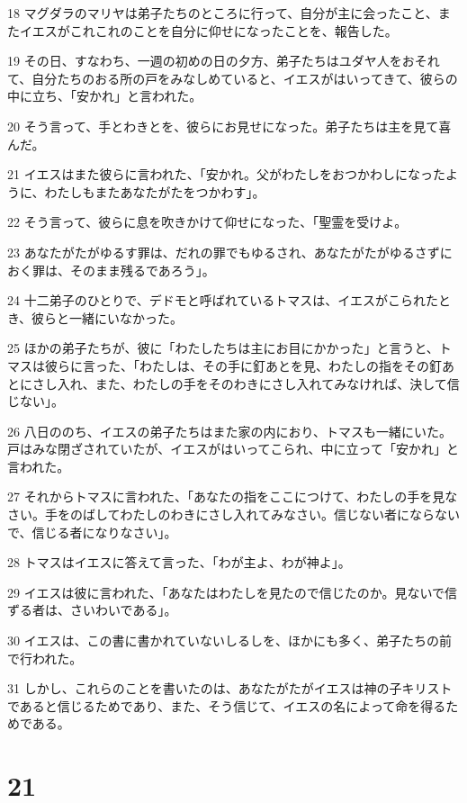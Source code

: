 \par 18 マグダラのマリヤは弟子たちのところに行って、自分が主に会ったこと、またイエスがこれこれのことを自分に仰せになったことを、報告した。
\par 19 その日、すなわち、一週の初めの日の夕方、弟子たちはユダヤ人をおそれて、自分たちのおる所の戸をみなしめていると、イエスがはいってきて、彼らの中に立ち、「安かれ」と言われた。
\par 20 そう言って、手とわきとを、彼らにお見せになった。弟子たちは主を見て喜んだ。
\par 21 イエスはまた彼らに言われた、「安かれ。父がわたしをおつかわしになったように、わたしもまたあなたがたをつかわす」。
\par 22 そう言って、彼らに息を吹きかけて仰せになった、「聖霊を受けよ。
\par 23 あなたがたがゆるす罪は、だれの罪でもゆるされ、あなたがたがゆるさずにおく罪は、そのまま残るであろう」。
\par 24 十二弟子のひとりで、デドモと呼ばれているトマスは、イエスがこられたとき、彼らと一緒にいなかった。
\par 25 ほかの弟子たちが、彼に「わたしたちは主にお目にかかった」と言うと、トマスは彼らに言った、「わたしは、その手に釘あとを見、わたしの指をその釘あとにさし入れ、また、わたしの手をそのわきにさし入れてみなければ、決して信じない」。
\par 26 八日ののち、イエスの弟子たちはまた家の内におり、トマスも一緒にいた。戸はみな閉ざされていたが、イエスがはいってこられ、中に立って「安かれ」と言われた。
\par 27 それからトマスに言われた、「あなたの指をここにつけて、わたしの手を見なさい。手をのばしてわたしのわきにさし入れてみなさい。信じない者にならないで、信じる者になりなさい」。
\par 28 トマスはイエスに答えて言った、「わが主よ、わが神よ」。
\par 29 イエスは彼に言われた、「あなたはわたしを見たので信じたのか。見ないで信ずる者は、さいわいである」。
\par 30 イエスは、この書に書かれていないしるしを、ほかにも多く、弟子たちの前で行われた。
\par 31 しかし、これらのことを書いたのは、あなたがたがイエスは神の子キリストであると信じるためであり、また、そう信じて、イエスの名によって命を得るためである。

\chapter{21}

